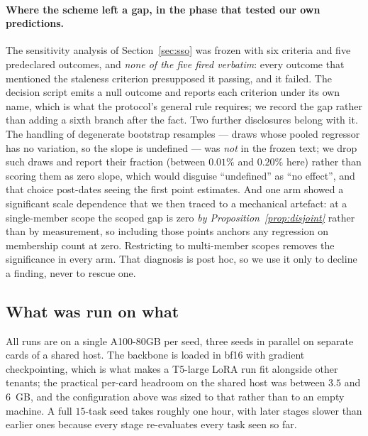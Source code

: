 \paragraph{Where the scheme left a gap, in the phase that tested our own predictions.}
The sensitivity analysis of Section~\ref{sec:sso} was frozen with six criteria and
five predeclared outcomes, and \emph{none of the five fired verbatim}: every outcome
that mentioned the staleness criterion presupposed it passing, and it failed. The
decision script emits a null outcome and reports each criterion under its own name,
which is what the protocol's general rule requires; we record the gap rather than
adding a sixth branch after the fact. Two further disclosures belong with it. The
handling of degenerate bootstrap resamples --- draws whose pooled regressor has no
variation, so the slope is undefined --- was \emph{not} in the frozen text; we drop
such draws and report their fraction (between $0.01\%$ and $0.20\%$ here) rather than
scoring them as zero slope, which would disguise ``undefined'' as ``no effect'', and
that choice post-dates seeing the first point estimates. And one arm showed a
significant scale dependence that we then traced to a mechanical artefact: at a
single-member scope the scoped gap is zero \emph{by Proposition~\ref{prop:disjoint}}
rather than by measurement, so including those points anchors any regression on
membership count at zero. Restricting to multi-member scopes removes the significance
in every arm. That diagnosis is post hoc, so we use it only to decline a finding,
never to rescue one.

\subsection{What was run on what}
\label{app:compute}

All runs are on a single A100-80GB per seed, three seeds in parallel on separate
cards of a shared host. The backbone is loaded in bf16 with gradient checkpointing,
which is what makes a T5-large LoRA run fit alongside other tenants; the practical
per-card headroom on the shared host was between $3.5$ and $6$~GB, and the
configuration above was sized to that rather than to an empty machine. A full
$15$-task seed takes roughly one hour, with later stages slower than earlier ones
because every stage re-evaluates every task seen so far.
